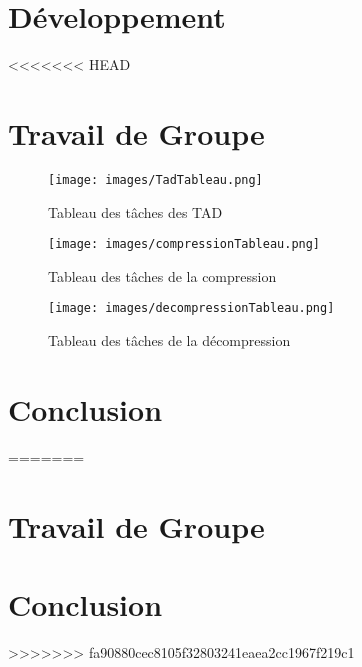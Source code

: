 \documentclass[10pt]{report}
\begin{document}
    \chapter{Développement}
        
                
<<<<<<< HEAD
        \chapter{Travail de Groupe}
        \begin{figure}[h] 
   			 \centering      
    		\texttt{[image: images/TadTableau.png]}
    		\caption{Tableau des tâches des TAD}
    		\label{fig:exemple}
		\end{figure}
		\begin{figure}[h] 
   			 \centering      
    		\texttt{[image: images/compressionTableau.png]}
    		\caption{Tableau des tâches de la compression}
    		\label{fig:exemple}
		\end{figure}
		\begin{figure}[h] 
   			 \centering      
    		\texttt{[image: images/decompressionTableau.png]}
    		\caption{Tableau des tâches de la décompression}
    		\label{fig:exemple}
		\end{figure}
        \chapter{Conclusion}
=======
    \chapter{Travail de Groupe}
        

    \chapter{Conclusion}
        

>>>>>>> fa90880cec8105f32803241eaea2cc1967f219c1
\end{document}
